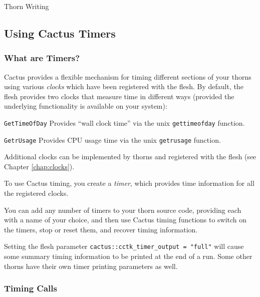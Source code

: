 \begin{cactuspart}{Thorn Writing}

\subsection{Using Cactus Timers}
\label{sec:timers}

\subsubsection{What are Timers?}

Cactus provides a flexible mechanism for timing different sections of your
thorns using various \textit{clocks} which have been registered with the flesh. 
By default, the flesh provides two clocks that measure time in different
ways (provided the underlying functionality is available on your system):

\begin{Lentry}

\item[\texttt{GetTimeOfDay}]
        Provides ``wall clock time'' via the unix \texttt{gettimeofday} function.
\item[\texttt{GetrUsage}]
        Provides CPU usage time via the unix \texttt{getrusage} function.
\end{Lentry}

Additional clocks can be implemented by thorns and registered with the
flesh (see Chapter \ref{chap:clocks}).

To use Cactus timing, you create a \textit{timer}, which provides time
information for all the registered clocks.

You can add any number of timers to your thorn source code, providing
each with a name of your choice, and then use Cactus timing functions to
switch on the timers, stop or reset them, and recover timing information.

Setting the flesh parameter \texttt{cactus::cctk\_timer\_output = "full"}
will cause some summary timing information to be printed at the end of a run. 
Some other thorns have their own timer printing parameters as well.

\subsubsection{Timing Calls}


\end{cactuspart}
